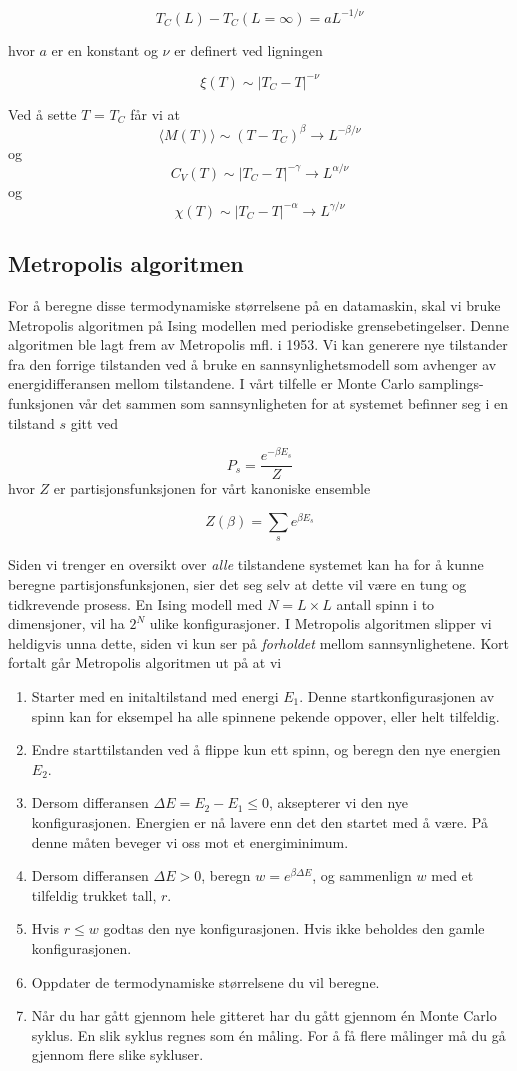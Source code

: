 \documentclass[11pt,a4paper]{article}
\begin{document}
\[T_C(L) - T_C(L=\infty ) = aL^{-1/\nu}  \]

hvor $a$ er en konstant og $\nu$ er definert ved ligningen

\[\xi (T) \sim |T_C - T|^{-\nu} \]

Ved å sette $T$ = $T_C$ får vi at
\[ \langle M(T) \rangle \sim (T-T_C)^\beta \rightarrow L^{-\beta/\nu} \]
og
\[C_V(T) \sim |T_C-T|^{-\gamma} \rightarrow L^{\alpha/\nu} \]
og
\[ \chi (T) \sim |T_C - T|^{-\alpha} \rightarrow L^{\gamma / \nu } \]

\subsection{Metropolis algoritmen}
For å beregne disse termodynamiske størrelsene på en datamaskin, skal vi bruke Metropolis algoritmen på Ising modellen med periodiske grensebetingelser. Denne algoritmen ble lagt frem av Metropolis mfl. i 1953. Vi kan generere nye tilstander fra den forrige tilstanden ved å bruke en sannsynlighetsmodell som avhenger av energidifferansen mellom tilstandene. I vårt tilfelle er Monte Carlo samplings-funksjonen vår det sammen som sannsynligheten for at systemet befinner seg i en tilstand $s$ gitt ved 

\[P_s = \frac{e^{-\beta E_s}}{Z} \]
hvor $Z$ er partisjonsfunksjonen for vårt kanoniske ensemble

\[Z(\beta) = \sum_s e^{\beta E_s}  \]

Siden vi trenger en oversikt over \textit{alle} tilstandene systemet kan ha for å kunne beregne partisjonsfunksjonen, sier det seg selv at dette vil være en tung og tidkrevende prosess. En Ising modell med $N=L\times L$ antall spinn i to dimensjoner, vil ha $2^N$ ulike konfigurasjoner. I Metropolis algoritmen slipper vi heldigvis unna dette, siden vi kun ser på \textit{forholdet} mellom sannsynlighetene. Kort fortalt går Metropolis algoritmen ut på at vi

\begin{enumerate}
\item Starter med en initaltilstand med energi $E_1$. Denne startkonfigurasjonen av spinn kan for eksempel ha alle spinnene pekende oppover, eller helt tilfeldig.
\item Endre starttilstanden ved å flippe kun ett spinn, og beregn den nye energien $E_2$.
\item Dersom differansen $\Delta E = E_2 - E_1 \le 0 $, aksepterer vi den nye konfigurasjonen. Energien er nå lavere enn det den startet med å være. På denne måten beveger vi oss mot et energiminimum.
\item Dersom differansen $\Delta E > 0$, beregn $w = e^{\beta \Delta E} $, og sammenlign $w$ med et tilfeldig trukket tall, $r$.
\item Hvis $r \le w$ godtas den nye konfigurasjonen. Hvis ikke beholdes den gamle konfigurasjonen. 
\item Oppdater de termodynamiske størrelsene du vil beregne.
\item Når du har gått gjennom hele gitteret har du gått gjennom én Monte Carlo syklus. En slik syklus regnes som én måling. For å få flere målinger må du gå gjennom flere slike sykluser.
\end{enumerate}
\end{document}
